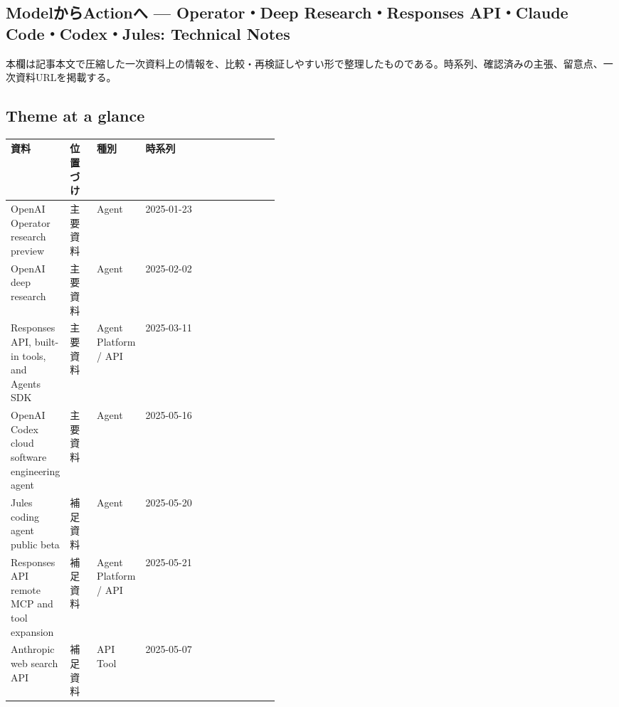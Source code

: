 \subsection*{ModelからActionへ — Operator・Deep Research・Responses API・Claude Code・Codex・Jules: Technical Notes}
本欄は記事本文で圧縮した一次資料上の情報を、比較・再検証しやすい形で整理したものである。時系列、確認済みの主張、留意点、一次資料URLを掲載する。
\medskip
\subsection*{Theme at a glance}
\begin{center}
\footnotesize
\begin{tabularx}{\linewidth}{@{}p{0.20\linewidth}p{0.10\linewidth}p{0.14\linewidth}X@{}}
\toprule
資料 & 位置づけ & 種別 & 時系列 \\
\midrule
OpenAI Operator research preview & 主要資料 & Agent & 2025-01-23 \\
OpenAI deep research & 主要資料 & Agent & 2025-02-02 \\
Responses API, built-in tools, and Agents SDK & 主要資料 & Agent Platform / API & 2025-03-11 \\
OpenAI Codex cloud software engineering agent & 主要資料 & Agent & 2025-05-16 \\
Jules coding agent public beta & 補足資料 & Agent & 2025-05-20 \\
Responses API remote MCP and tool expansion & 補足資料 & Agent Platform / API & 2025-05-21 \\
Anthropic web search API & 補足資料 & API Tool & 2025-05-07 \\
\bottomrule
\end{tabularx}
\end{center}
\normalsize

